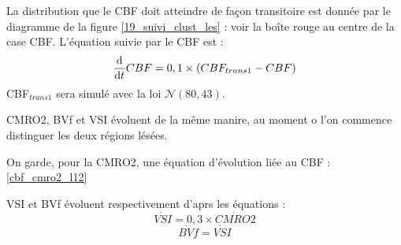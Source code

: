 \begin{enumerate}[label=\textbf{(L\'esion 1 - \arabic*)}]
\par
La distribution que le CBF doit atteindre de fa\c con transitoire est donn\'ee par le diagramme de la figure \ref{19_suivi_clust_les} : %
voir la bo\^ite rouge au centre de la case \og{} CBF\fg{}. L'\'equation suivie par le CBF est :
\begin{equation}
\der{CBF}=0, 1\times \left(CBF_{trans1}-CBF\right)%
\end{equation}
CBF${}_{trans1}$ sera simul\'e avec la loi $\mathcal{N}(80,43)$.

\par
CMRO2, BVf et VSI \'evoluent de la m\^eme manire, au moment o l'on commence  distinguer les deux r\'egions l\'es\'ees.

\par
On garde, pour la CMRO2, une \'equation d'\'evolution li\'ee au CBF : \ref{cbf_cmro2_l12}
\begin{comment}
\par
On mod\'elise, en premier lieu, l'\'evolution de la CMRO2, qui est la plus facile \g{a} lire. %
La m\'ediane et les quartiles de cette variable, prise au jour 8 sont, dans l'ordre : 3, 5 et 7. %
On choisit donc, comme distribution des valeurs de CMRO2 sur la premi\g{e}re r'egion l\'es\'ee au jour 8, %
un \'echantillon gaussien CMRO2${}_{trans1}$ de loi $\mathcal{N}(5,3)$.

\par
On utilise la m\'ethode vue pour le CBF pour obtenir une \'equation en CMRO2 : %
supposons en effet que cette variable satisfasse l\'equation :
\[\der{CMRO2}=\tau_{CMRO2}\times \left(CMRO2_{trans1}-CMRO2\right)\]
On note que la valeur m\'ediane de la CMRO2 n'est pas connue pour les jours 4 \g{a} 7. %
on remplace donc la diff\'erence de m\'edianes \og{}$m^3-m^0$\fg{} par 5, valeur m\'ediane de la CMRO2${}_{trans1}$. %
L'\'evolution de la CMRO2 sera donc suffisamment rapide pour que cette variable prenne les valeurs mesur\'ees au jour 8.

\par
On pose donc : $\tau_{CMRO2}=5\times\ln\left(\frac{5}{2}\right)$, ce qui nous donne pour l'\'evolution de la CMRO2 :
\begin{equation}
\der{CMRO2}=4, 6\times \left(CMRO2_{trans1}-CMRO2\right)%
\end{equation}
\end{comment}

VSI et BVf \'evoluent respectivement d'aprs les \'equations :
\begin{equation}
\dot{VSI}=0,3\times\dot{CMRO2}
\label{vsi_is1_tr}
\end{equation}
\begin{equation}
\dot{BVf}=\dot{VSI}
\label{bvf_is1_tr}
\end{equation}


\end{enumerate}
